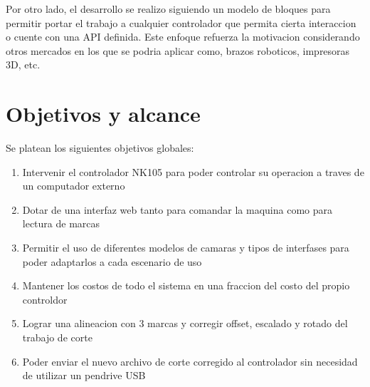    Por otro lado, el desarrollo se realizo siguiendo un modelo de bloques para permitir portar el trabajo a cualquier controlador que permita cierta interaccion o cuente con una API definida.
   Este enfoque refuerza la motivacion considerando otros mercados en los que se podria aplicar como, brazos roboticos, impresoras 3D, etc.

\section{Objetivos y alcance}
   Se platean los siguientes objetivos globales:
   \begin{enumerate}
      \item{Intervenir el controlador NK105 para poder controlar su operacion a traves de un computador externo}
      \item{Dotar de una interfaz web tanto para comandar la maquina como para lectura de marcas}
      \item{Permitir el uso de diferentes modelos de camaras y tipos de interfases para poder adaptarlos a cada escenario de uso}
      \item{Mantener los costos de todo el sistema en una fraccion del costo del propio controldor}
      \item{Lograr una alineacion con 3 marcas y corregir offset, escalado y rotado del trabajo de corte}
      \item{Poder enviar el nuevo archivo de corte corregido al controlador sin necesidad de utilizar un pendrive USB}
   \end{enumerate}


